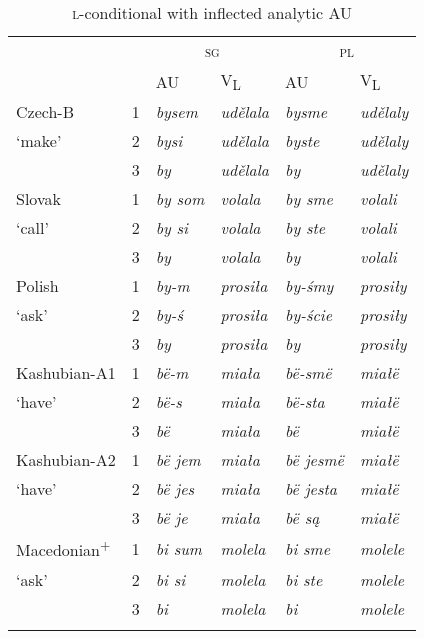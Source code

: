 \documentclass[output=paper]{langscibook}
\begin{document}
\begin{table}[p]
\begin{tabular}{llllll}
\lsptoprule
& & \multicolumn{2}{c}{\textsc{sg}} & \multicolumn{2}{c}{\textsc{pl}} \\\cmidrule(lr){3-4}\cmidrule(lr){5-6}
& & AU & V\textsubscript{L} & AU & V\textsubscript{L} \\
\midrule
Czech-B & 1 & \textit{bysem} & \textit{udělala} & \textit{bysme} & \textit{udělaly} \\ 
`make' & 2 & \textit{bysi} & \textit{udělala} & \textit{byste} & \textit{udělaly} \\ 
 & 3 & \textit{by} & \textit{udělala} & \textit{by} & \textit{udělaly} \\\addlinespace
Slovak & 1 & \textit{by som} & \textit{volala} & \textit{by sme} & \textit{volali} \\ 
`call'        & 2 & \textit{by si} & \textit{volala} & \textit{by ste} & \textit{volali} \\ 
            & 3 & \textit{by} & \textit{volala} & \textit{by} & \textit{volali} \\\addlinespace
Polish & 1 & \textit{by-m} & \textit{prosiła} & \textit{by-śmy} & \textit{prosiły} \\ 
`ask'        & 2 & \textit{by-ś} & \textit{prosiła} & \textit{by-ście} & \textit{prosiły} \\ 
            & 3 & \textit{by} & \textit{prosiła} & \textit{by} & \textit{prosiły} \\\addlinespace
Kashubian-A1 & 1 & \textit{bë-m} & \textit{miała} & \textit{bë-smë} & \textit{miałë} \\ 
`have'        & 2 & \textit{bë-s} & \textit{miała} & \textit{bë-sta} & \textit{miałë} \\ 
            & 3 & \textit{bë} & \textit{miała} & \textit{bë} & \textit{miałë} \\\addlinespace
Kashubian-A2 & 1 & \textit{bë jem} & \textit{miała} & \textit{bë jesmë} & \textit{miałë} \\ 
`have'        & 2 & \textit{bë jes} & \textit{miała} & \textit{bë jesta} & \textit{miałë} \\ 
            & 3 & \textit{bë je} & \textit{miała} & \textit{bë są} & \textit{miałë} \\\addlinespace
Macedonian\textsuperscript{+} & 1 & \textit{bi sum} & \textit{molela} & \textit{bi sme} & \textit{molele} \\ 
`ask' & 2 & \textit{bi si} & \textit{molela} & \textit{bi ste} & \textit{molele} \\ 
 & 3 & \textit{bi} & \textit{molela} & \textit{bi} & \textit{molele} \\
\lspbottomrule
\end{tabular}
    \caption{\textsc{l-}conditional with inflected analytic AU}
    \label{pitsch:tab:conditional_analytic}
\end{table}
\clearpage
\end{document}
